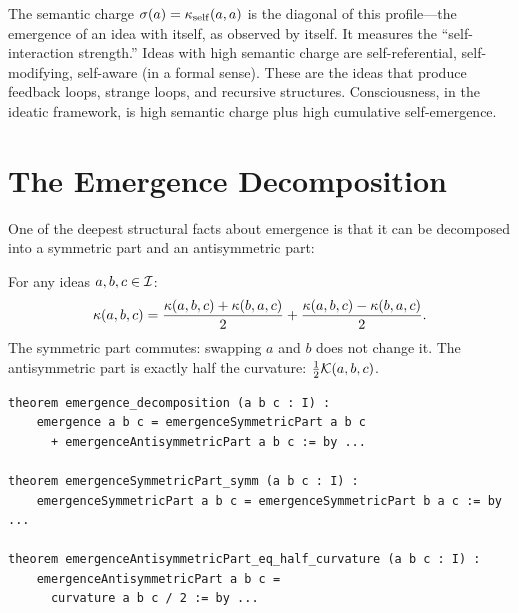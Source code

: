 \begin{interpretation}
The semantic charge $\sigma(a) = \kappa_{\mathrm{self}}(a, a)$ is the diagonal
of this profile---the emergence of an idea with itself, as observed by itself.
It measures the ``self-interaction strength.'' Ideas with high semantic charge
are self-referential, self-modifying, self-aware (in a formal sense). These
are the ideas that produce feedback loops, strange loops, and recursive structures.
Consciousness, in the ideatic framework, is high semantic charge plus high
cumulative self-emergence.
\end{interpretation}


\section{The Emergence Decomposition}

One of the deepest structural facts about emergence is that it can be decomposed
into a symmetric part and an antisymmetric part:

\begin{theorem}
\label{thm:emergence-decomposition}
For any ideas $a, b, c \in \mathcal{I}$:
\[
  \kappa(a,b,c) = \frac{\kappa(a,b,c) + \kappa(b,a,c)}{2}
  + \frac{\kappa(a,b,c) - \kappa(b,a,c)}{2}.
\]
The symmetric part commutes: swapping $a$ and $b$ does not change it.
The antisymmetric part is exactly half the curvature: $\frac{1}{2}\mathcal{K}(a,b,c)$.
\end{theorem}

\begin{lstlisting}[caption={Emergence decomposition (IDT\_v3\_Emergence.lean)}]
theorem emergence_decomposition (a b c : I) :
    emergence a b c = emergenceSymmetricPart a b c
      + emergenceAntisymmetricPart a b c := by ...

theorem emergenceSymmetricPart_symm (a b c : I) :
    emergenceSymmetricPart a b c = emergenceSymmetricPart b a c := by ...

theorem emergenceAntisymmetricPart_eq_half_curvature (a b c : I) :
    emergenceAntisymmetricPart a b c =
      curvature a b c / 2 := by ...
\end{lstlisting}

